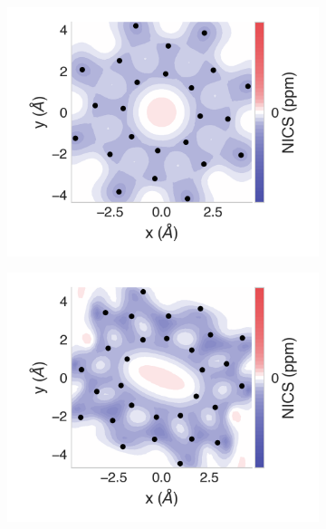 \documentclass[
	fontsize=10pt, %
	twoside=true, %
	numbers=noenddot, %
]{kaobook}
\begin{document}
\begin{figure}[h]
\centering
\begin{subfigure}{5.5cm}\centering\includegraphics{asn08-2d}\end{subfigure}%
\begin{subfigure}{5.5cm}\centering\includegraphics{asn10-2d}\end{subfigure}%

\end{figure}
\end{document}
